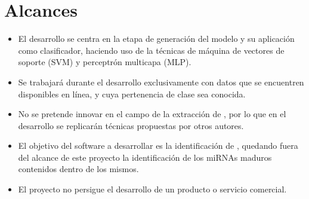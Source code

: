 %
%
%
\section{Alcances}
%
\begin{itemize}
\item
  El desarrollo se centra en la etapa de generación del modelo
  y su aplicación como clasificador, haciendo uso de la técnicas de
  máquina de vectores de soporte (SVM) y perceptrón multicapa
  (MLP).
\item
  Se trabajará durante el desarrollo exclusivamente con datos que se
  encuentren disponibles en línea, y cuya pertenencia de clase sea
  conocida.
\item
  No se pretende innovar en el campo de la extracción de ,
  por lo que en el desarrollo se replicarán técnicas propuestas
  por otros autores.
\item
  El objetivo del software a desarrollar es la identificación de
  , quedando fuera del alcance de este proyecto la
  identificación de los miRNAs maduros contenidos dentro de los 
  mismos.
\item
  El proyecto no persigue el desarrollo de un producto o servicio
  comercial.
\end{itemize}
%
